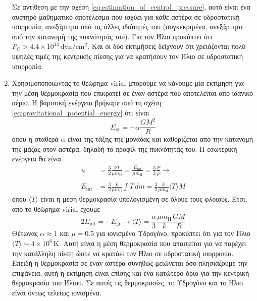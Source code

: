 \begin{enumerate}
        Σε αντίθεση με την σχέση \eqref{eq:estimation_of_central_pressure}, αυτό είναι ένα αυστηρό μαθηματικό αποτέλεσμα που ισχύει για κάθε αστέρα σε υδροστατική ισορροπία, ανεξάρτητα από τις άλλες ιδιότητές του (συγκεκριμένα, ανεξάρτητα από την κατανομή της πυκνότητάς του). Για τον Ήλιο προκύπτει ότι $P_{\text{C}} > 4.4 \times 10^{14} \,\text{dyn/cm$^2$}$. Και οι δύο εκτιμήσεις δείχνουν ότι χρειάζονται πολύ υψηλές τιμές της κεντρικής πίεσης για να κρατήσουν τον Ήλιο σε υδροστατική ισορροπία.
        
        
        \item Χρησιμοποποιώντας το θεώρημα virial μπορούμε να κάνουμε μία εκτίμηση για την μέση θερμοκρασία που επικρατεί σε έναν αστέρα που αποτελείται από ιδανικό αέριο. Η βαρυτική ενέργεια βρήκαμε από τη σχέση \eqref{eq:gravitational_potential_energy} ότι είναι
        \begin{equation*}
            E_{\text{gr}} = - \alpha \frac{GM^2}{R}
        \end{equation*}
        όπου η σταθερά $\alpha$ είναι της τάξης της μονάδας και καθορίζεται από την κατανομή της μάζας στον αστέρα, δηλαδή το προφίλ της πυκνότητάς του. Η εσωτερική ενέργεια θα είναι
        \begin{align*}
            u &= \frac{3}{2} \frac{kT}{\mu m_{\text{H}}} = \frac{E_{\text{int}}}{\mu m_{\text{H}}} = \frac{3}{2} \frac{P}{\rho}  \longrightarrow \\\\
            E_{\text{int}} &= \frac{3}{2} \frac{k}{\mu m_{\text{H}}} \int T \,dm = \frac{3}{2} \frac{k}{\mu m_{\text{H}}} \langle T \rangle M
        \end{align*}
        όπου $\langle T \rangle$ είναι η μέση θερμοκρασία υπολογισμένη σε όλους τους φλοιούς. Έτσι, από το θεώρημα virial έχουμε
        \begin{equation}
            2 E_{\text{int}} = - E_{\text{gr}} \longrightarrow \langle T \rangle = \frac{\alpha}{3} \frac{\mu m_{\text{H}}}{k} \frac{GM}{R}
        \end{equation}
        Θέτωνας $\alpha \approx 1$ και $\mu = 0.5$ για ιονισμένο Υδρογόνο, προκύπτει ότι για τον Ήλιο
        $\langle T \rangle \sim 4 \times 10^6 \,\text{K}$. Αυτή είναι η μέση θερμοκρασία που απαιτείται για να παρέχει την κατάλληλη πίεση ώστε να κρατάει τον Ήλιο σε υδροστατική ισορροπία. Επειδή η θερμοκρασία σε έναν αστέρα συνήθως μειώνεται όσο πλησιάζουμε την επιφάνεια, αυτή η εκτίμηση είναι επίσης και ένα κατώτερο όριο για την κεντρική θερμοκρασία του Ήλιου. Σε αυτές τις θερμοκρασίες, το Υδρογόνο και το Ήλιο είναι όντως τελείως ιονισμένα.
\end{enumerate}
